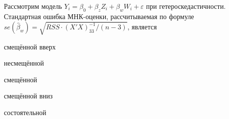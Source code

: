 
\begin{question}
Рассмотрим модель
\(Y_i= \beta_0 + \beta_z Z_{i} + \beta_w W_{i} + \varepsilon\) при
гетероскедастичности. Стандартная ошибка МНК-оценки, рассчитываемая по
формуле \(se(\hat\beta_w)=\sqrt{RSS \cdot (X'X)^{-1}_{33}/(n-3)}\),
является
\begin{answerlist}
  \item смещённой вверх
  \item несмещённой
  \item смещённой
  \item смещённой вниз
  \item состоятельной
\end{answerlist}
\end{question}



